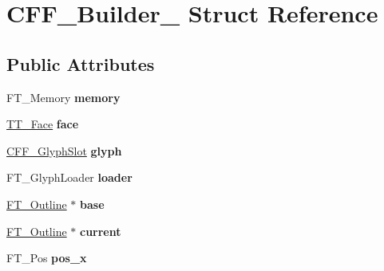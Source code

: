 \hypertarget{struct_c_f_f___builder__}{}\section{C\+F\+F\+\_\+\+Builder\+\_\+ Struct Reference}
\label{struct_c_f_f___builder__}
\subsection*{Public Attributes}
\begin{DoxyCompactItemize}
\item 
\mbox{\label{struct_c_f_f___builder___a41fce66940ca6e0a746f0839d076142f}} 
F\+T\+\_\+\+Memory {\bfseries memory}
\item 
\mbox{\label{struct_c_f_f___builder___a415e44897a8329823ff2cea2990d8935}} 
\hyperlink{struct_t_t___face_rec__}{T\+T\+\_\+\+Face} {\bfseries face}
\item 
\mbox{\label{struct_c_f_f___builder___a527ba659637b4e50be221d8b00d337c8}} 
\hyperlink{struct_c_f_f___glyph_slot_rec__}{C\+F\+F\+\_\+\+Glyph\+Slot} {\bfseries glyph}
\item 
\mbox{\label{struct_c_f_f___builder___a358be6966e4199e54d5551f81f496a5b}} 
F\+T\+\_\+\+Glyph\+Loader {\bfseries loader}
\item 
\mbox{\label{struct_c_f_f___builder___a7c351f6ae7233c249f85f2371d809bac}} 
\hyperlink{struct_f_t___outline__}{F\+T\+\_\+\+Outline} $\ast$ {\bfseries base}
\item 
\mbox{\label{struct_c_f_f___builder___acd27e804cd32054865ef4236e7f9dc93}} 
\hyperlink{struct_f_t___outline__}{F\+T\+\_\+\+Outline} $\ast$ {\bfseries current}
\item 
\mbox{\label{struct_c_f_f___builder___a045d91695d51a1fbfa307aab507fa46b}} 
F\+T\+\_\+\+Pos {\bfseries pos\+\_\+x}
\item 
\mbox{\label{struct_c_f_f___builder___a50a8bec8b857853829f42195101db472}} 

\end{DoxyCompactItemize}
